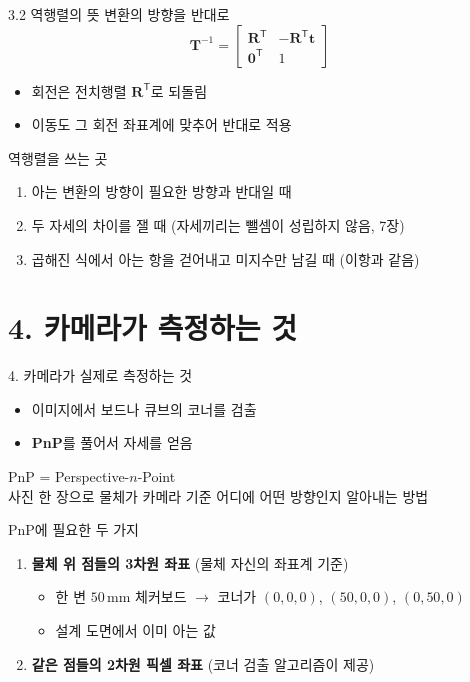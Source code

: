 \documentclass[aspectratio=169,11pt]{beamer}
\begin{document}
\begin{frame}{3.2 역행렬의 뜻}
  변환의 방향을 반대로
  \[
    \mathbf{T}^{-1}
    =
    \begin{bmatrix}
      \mathbf{R}^{\mathsf T} & -\mathbf{R}^{\mathsf T}\mathbf{t} \\
      \mathbf{0}^{\mathsf T} & 1
    \end{bmatrix}
  \]
  \begin{itemize}
    \item 회전은 전치행렬 $\mathbf{R}^{\mathsf T}$로 되돌림
    \item 이동도 그 회전 좌표계에 맞추어 반대로 적용
  \end{itemize}
  \vfill
  \begin{block}{역행렬을 쓰는 곳}
    \begin{enumerate}
      \item 아는 변환의 방향이 필요한 방향과 반대일 때
      \item 두 자세의 차이를 잴 때 (자세끼리는 뺄셈이 성립하지 않음, 7장)
      \item 곱해진 식에서 아는 항을 걷어내고 미지수만 남길 때 (이항과 같음)
    \end{enumerate}
  \end{block}
\end{frame}

\section{4. 카메라가 측정하는 것}

\begin{frame}{4. 카메라가 실제로 측정하는 것}
  \begin{itemize}
    \item 이미지에서 보드나 큐브의 코너를 검출
    \item \textbf{PnP}를 풀어서 자세를 얻음
  \end{itemize}
  \vfill
  PnP = Perspective-$n$-Point\\
  사진 한 장으로 물체가 카메라 기준 어디에 어떤 방향인지 알아내는 방법
  \vfill
  \begin{block}{PnP에 필요한 두 가지}
    \begin{enumerate}
      \item \textbf{물체 위 점들의 3차원 좌표} (물체 자신의 좌표계 기준)
        \begin{itemize}
          \item 한 변 $50\,\mathrm{mm}$ 체커보드 $\rightarrow$
            코너가 $(0,0,0)$, $(50,0,0)$, $(0,50,0)$
          \item 설계 도면에서 이미 아는 값
        \end{itemize}
      \item \textbf{같은 점들의 2차원 픽셀 좌표} (코너 검출 알고리즘이 제공)
    \end{enumerate}
  \end{block}
\end{frame}
\end{document}
